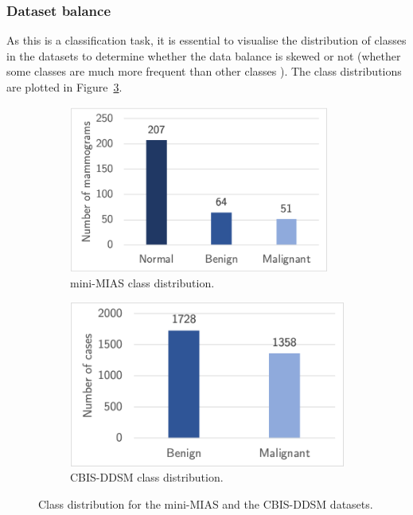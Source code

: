\subsubsection{Dataset balance}
\label{sec:design-dataset-balance}

As this is a classification task, it is essential to visualise the distribution of classes in the datasets to determine whether the data balance is skewed or not (whether some classes are much more frequent than other classes \citep{Geron2019}). The class distributions are plotted in Figure~\ref{fig:design-datasets-balance}.

\begin{figure}[h]
\centering
\begin{subfigure}{.5\textwidth}
  \centering
  \includegraphics[width=0.94\textwidth]{figures/design/mini-mias-balance.png}
  \caption{mini-MIAS class distribution.}
  \label{fig:design-mini-mias-balance}
\end{subfigure}%
\begin{subfigure}{.5\textwidth}
  \centering
  \includegraphics[width=\textwidth]{figures/design/cbis-ddsm-balance.png}
  \caption{CBIS-DDSM class distribution.}
  \label{fig:cbis-ddsm-balance}
\end{subfigure}
\caption{\label{fig:design-datasets-balance}Class distribution for the mini-MIAS and the CBIS-DDSM datasets.}
\end{figure}

